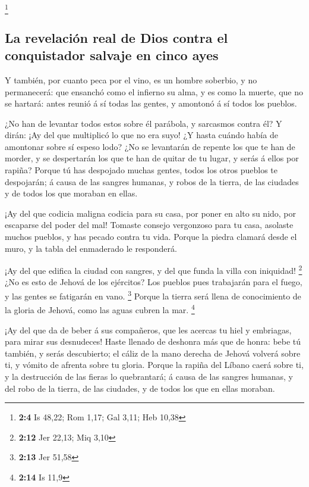 \footnote{\textbf{2:4} Is 48,22; Rom 1,17; Gal 3,11; Heb 10,38}

\hypertarget{la-revelaciuxf3n-real-de-dios-contra-el-conquistador-salvaje-en-cinco-ayes}{%
\subsection{La revelación real de Dios contra el conquistador salvaje en
cinco
ayes}\label{la-revelaciuxf3n-real-de-dios-contra-el-conquistador-salvaje-en-cinco-ayes}}

 Y también, por cuanto peca por el vino, es un hombre
soberbio, y no permanecerá: que ensanchó como el infierno su alma, y es
como la muerte, que no se hartará: antes reunió á sí todas las gentes, y
amontonó á sí todos los pueblos.

 ¿No han de levantar todos estos sobre él parábola, y
sarcasmos contra él? Y dirán: ¡Ay del que multiplicó lo que no era suyo!
¿Y hasta cuándo había de amontonar sobre sí espeso lodo? 
¿No se levantarán de repente los que te han de morder, y se despertarán
los que te han de quitar de tu lugar, y serás á ellos por rapiña?
 Porque tú has despojado muchas gentes, todos los otros
pueblos te despojarán; á causa de las sangres humanas, y robos de la
tierra, de las ciudades y de todos los que moraban en ellas.

 ¡Ay del que codicia maligna codicia para su casa, por poner
en alto su nido, por escaparse del poder del mal!  Tomaste
consejo vergonzoso para tu casa, asolaste muchos pueblos, y has pecado
contra tu vida.  Porque la piedra clamará desde el muro, y
la tabla del enmaderado le responderá.

 ¡Ay del que edifica la ciudad con sangres, y del que funda
la villa con iniquidad! \footnote{\textbf{2:12} Jer 22,13; Miq 3,10}
 ¿No es esto de Jehová de los ejércitos? Los pueblos pues
trabajarán para el fuego, y las gentes se fatigarán en vano. \footnote{\textbf{2:13}
  Jer 51,58}  Porque la tierra será llena de conocimiento
de la gloria de Jehová, como las aguas cubren la mar. \footnote{\textbf{2:14}
  Is 11,9}

 ¡Ay del que da de beber á sus compañeros, que les acercas
tu hiel y embriagas, para mirar sus desnudeces!  Haste
llenado de deshonra más que de honra: bebe tú también, y serás
descubierto; el cáliz de la mano derecha de Jehová volverá sobre ti, y
vómito de afrenta sobre tu gloria.  Porque la rapiña del
Líbano caerá sobre ti, y la destrucción de las fieras lo quebrantará; á
causa de las sangres humanas, y del robo de la tierra, de las ciudades,
y de todos los que en ellas moraban.

